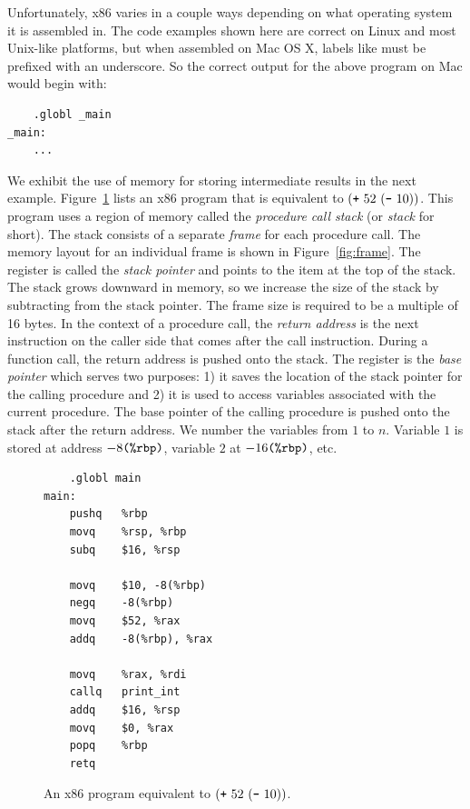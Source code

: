 \documentclass[11pt]{book}
\begin{document}
Unfortunately, x86 varies in a couple ways depending on what operating system it
is assembled in. The code examples shown here are correct on Linux and most
Unix-like platforms, but when assembled on Mac OS X, labels like  must
be prefixed with an underscore.  So the correct output for the above program on
Mac would begin with:
\begin{lstlisting}
	.globl _main
_main:
	...
\end{lstlisting}

We exhibit the use of memory for storing intermediate results in the
next example.  Figure~\ref{fig:p1-x86} lists an x86 program that is
equivalent to $(\texttt{+}~52~ (\texttt{-}~10) )$. This program uses a
region of memory called the \emph{procedure call stack} (or
\emph{stack} for short). The stack consists of a separate \emph{frame}
for each procedure call. The memory layout for an individual frame is
shown in Figure~\ref{fig:frame}.  The register  is called the
\emph{stack pointer} and points to the item at the top of the
stack. The stack grows downward in memory, so we increase the size of
the stack by subtracting from the stack pointer. The frame size is
required to be a multiple of 16 bytes. In the context of a procedure
call, the \emph{return address} is the next instruction on the caller
side that comes after the call instruction. During a function call,
the return address is pushed onto the stack.  The register 
is the \emph{base pointer} which serves two purposes: 1) it saves the
location of the stack pointer for the calling procedure and 2) it is
used to access variables associated with the current procedure.  The
base pointer of the calling procedure is pushed onto the stack after
the return address. We number the variables from $1$ to $n$. Variable
$1$ is stored at address $-8\texttt{(\%rbp)}$, variable $2$ at
$-16\texttt{(\%rbp)}$, etc.

\begin{figure}[tbp]
\begin{lstlisting}
	.globl main
main:
	pushq	%rbp
	movq	%rsp, %rbp
	subq	$16, %rsp

	movq	$10, -8(%rbp)
	negq	-8(%rbp)
	movq	$52, %rax
	addq	-8(%rbp), %rax

	movq	%rax, %rdi
	callq	print_int
	addq	$16, %rsp
	movq    $0, %rax
	popq	%rbp
	retq
\end{lstlisting}
\caption{An x86 program equivalent to $(\texttt{+}~52~(\texttt{-}~10) )$.}
\label{fig:p1-x86}
\end{figure}
\end{document}
